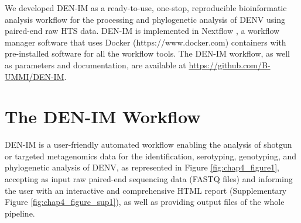 We developed DEN-IM as a ready-to-use, one-stop, reproducible bioinformatic analysis workflow for the processing and phylogenetic analysis of DENV using paired-end raw HTS data. DEN-IM is implemented in Nextflow \citep{di_tommaso_nextflow_2017}, a workflow manager software that uses Docker (https://www.docker.com) containers with pre-installed software for all the workflow tools. The DEN-IM workflow, as well as parameters and documentation, are available at \url{https://github.com/B-UMMI/DEN-IM}.

\section{The DEN-IM Workflow}

DEN-IM is a user-friendly automated workflow enabling the analysis of shotgun or targeted metagenomics data for the identification, serotyping, genotyping, and phylogenetic analysis of DENV, as represented in Figure \ref{fig:chap4_figure1}, accepting as input raw paired-end sequencing data (FASTQ files) and informing the user with an interactive and comprehensive HTML report (Supplementary Figure \ref{fig:chap4_figure_sup1}), as well as providing output files of the whole pipeline. 


